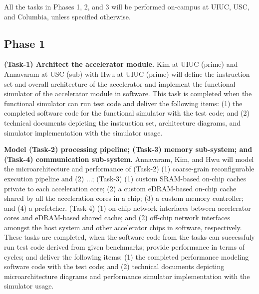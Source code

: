 
\noindent
All the tasks in Phases 1, 2, and 3 will be performed on-campus at UIUC, USC, and Columbia, unless specified otherwise.

\noindent
\subsection{Phase 1}

\noindent
\textbf{(Task-1) Architect the accelerator module.} 
Kim at UIUC (prime) and Annavaram at USC (sub) with Hwu at UIUC (prime) will define the instruction set and overall architecture of the accelerator and implement the functional simulator of the accelerator module in software.
This task is completed when the functional simulator can run test code and deliver the following items: 
(1) the completed software code for the functional simulator with the test code; and (2) technical documents depicting the instruction set, architecture diagrams, and simulator implementation with the simulator usage.


\noindent
\textbf{Model (Task-2) processing pipeline; (Task-3) memory sub-system; and (Task-4) communication sub-system.}
Annavaram, Kim, and Hwu will model the microarchitecture and performance of 
(Task-2) (1) coarse-grain reconfigurable execution pipeline and (2) ...;
(Task-3) (1) custom SRAM-based on-chip caches private to each acceleration core; (2) a custom eDRAM-based on-chip cache shared by all the acceleration cores in a chip; (3) a custom memory controller; and (4) a prefetcher.
(Task-4) (1) on-chip network interfaces between accelerator cores and eDRAM-based shared cache; and (2) off-chip network interfaces amongst the host system and other accelerator chips in software, respectively.
These tasks are completed, when the software code from the tasks can successfuly run test code derived from given benchmarks; provide performance in terms of cycles; and deliver the following items:
(1) the completed performance modeling software code with the test code; and (2) technical documents depicting microarchitecture diagrams and performance simulator implementation with the simulator usage.


